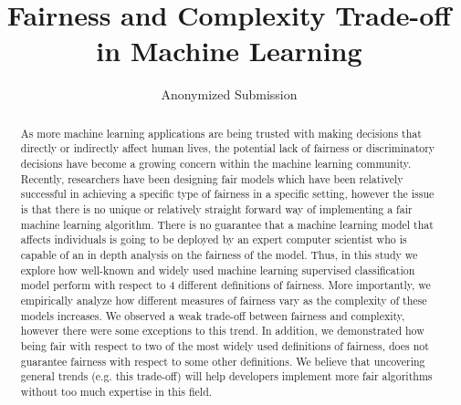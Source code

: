 \documentclass[sigconf]{acmart}
\begin{document}
\title{Fairness and Complexity Trade-off in Machine Learning}

\author{Anonymized Submission}


\begin{abstract}
As more machine learning applications are being trusted with making decisions that directly or indirectly affect human lives, the potential lack of fairness or discriminatory decisions have become a growing concern within the machine learning community. Recently, researchers have been designing fair models which have been relatively successful in achieving a specific type of fairness in a specific setting, however the issue is that there is no unique or relatively straight forward way of implementing a fair machine learning algorithm. There is no guarantee that a machine learning model that affects individuals is going to be deployed by an expert computer scientist who is capable of an in depth analysis on the fairness of the model. Thus, in this study we explore how well-known and widely used machine learning supervised classification model perform with respect to 4 different definitions of fairness. More importantly, we empirically analyze how different measures of fairness vary as the complexity of these models increases. We observed a weak trade-off between fairness and complexity, however there were some exceptions to this trend. In addition, we demonstrated how being fair with respect to two of the most widely used definitions of fairness, does not guarantee fairness with respect to some other definitions. We believe that uncovering general trends (e.g. this trade-off) will help developers implement more fair algorithms without too much expertise in this field.
\end{abstract}



\maketitle















\end{document}
